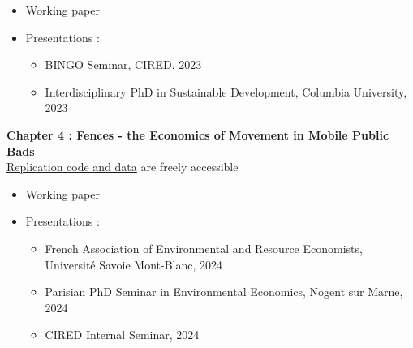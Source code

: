 %
\begin{itemize}
\item Working paper
\item Presentations : 
\begin{itemize}
\item BINGO Seminar, CIRED, 2023
\item Interdisciplinary PhD in Sustainable Development, Columbia University, 2023
\end{itemize}
\end{itemize}
%
\textbf{Chapter 4 : Fences - the Economics of Movement in Mobile Public Bads}\\
\href{https://github.com/sim-jean/fences}{Replication code and data} are freely accessible
%
\begin{itemize}
\item Working paper
\item Presentations : 
\begin{itemize}
\item French Association of Environmental and Resource Economists, Université Savoie Mont-Blanc, 2024
\item Parisian PhD Seminar in Environmental Economics, Nogent sur Marne, 2024
\item CIRED Internal Seminar, 2024
\end{itemize}
\end{itemize}
%

